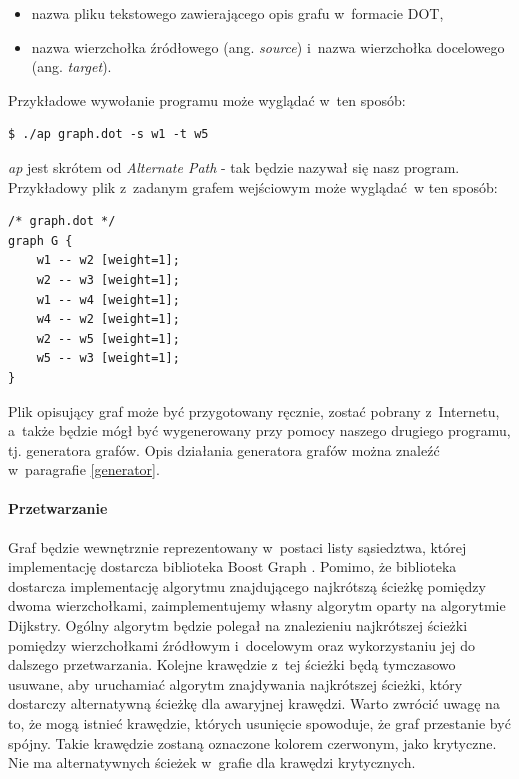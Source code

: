 \documentclass[a4paper, 12pt]{article}
\begin{document}
\begin{itemize}
\item nazwa pliku tekstowego zawierającego opis grafu w~formacie DOT,
\item nazwa wierzchołka źródłowego (ang. {\it source}) i~nazwa wierzchołka docelowego (ang. {\it target}).
\end{itemize}

Przykładowe wywołanie programu może wyglądać w~ten sposób:

\begin{verbatim}
$ ./ap graph.dot -s w1 -t w5
\end{verbatim}

{\it ap} jest skrótem od {\it Alternate Path} - tak będzie nazywał się nasz program. Przykładowy plik z~zadanym grafem wejściowym może wyglądać~w ten sposób:

\begin{verbatim}
/* graph.dot */
graph G {
	w1 -- w2 [weight=1];
	w2 -- w3 [weight=1];
	w1 -- w4 [weight=1];
	w4 -- w2 [weight=1];
	w2 -- w5 [weight=1];
	w5 -- w3 [weight=1];
}
\end{verbatim}

Plik opisujący graf może być przygotowany ręcznie, zostać pobrany z~Internetu, a~także będzie mógł być wygenerowany przy pomocy naszego drugiego programu, tj. generatora grafów. Opis działania generatora grafów można znaleźć w~paragrafie \ref{generator}.

\paragraph{Przetwarzanie}
Graf będzie wewnętrznie reprezentowany w~postaci listy sąsiedztwa, której implementację dostarcza biblioteka Boost Graph \cite{bgl}. Pomimo, że biblioteka dostarcza implementację algorytmu znajdującego najkrótszą ścieżkę pomiędzy dwoma wierzchołkami, zaimplementujemy własny algorytm oparty na algorytmie Dijkstry. Ogólny algorytm będzie polegał na znalezieniu najkrótszej ścieżki pomiędzy wierzchołkami źródłowym i~docelowym oraz wykorzystaniu jej do dalszego przetwarzania. Kolejne krawędzie z~tej ścieżki będą tymczasowo usuwane, aby uruchamiać algorytm znajdywania najkrótszej ścieżki, który dostarczy alternatywną ścieżkę dla awaryjnej krawędzi. Warto zwrócić uwagę na to, że mogą istnieć krawędzie, których usunięcie spowoduje, że graf przestanie być spójny. Takie krawędzie zostaną oznaczone kolorem czerwonym, jako krytyczne. Nie ma alternatywnych ścieżek w~grafie dla krawędzi krytycznych.
\end{document}
